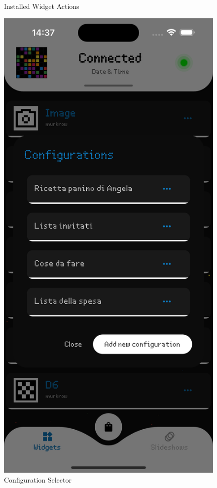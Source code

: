 \begin{figure}[h]
\begin{minipage}[b]{0.32\textwidth}
        \caption*{Installed Widget Actions}
    \end{minipage}
    \begin{minipage}[b]{0.32\textwidth}
        \centering
        \includegraphics[width=\textwidth]{tesi/img/client_demo/installed_widgets/config_choice.png}
        \caption*{Configuration Selector}
    \end{minipage}
\end{figure}
\newpage
